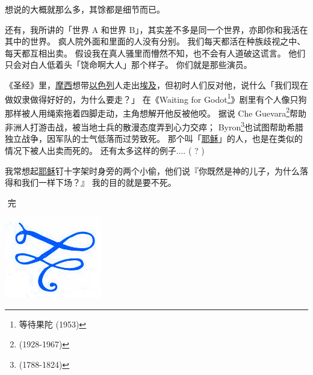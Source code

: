 \documentclass[12pt]{report}
\newcommand*\dashh{\textemdash\,\,}
\begin{document}
{\begin{figure}[ht]
\centering
{}
\end{figure}

想说的大概就那么多，其馀都是细节而已。

还有，我所讲的「世界 A 和世界 B」，其实差不多是同一个世界，亦即你和我活在其中的世界。 疯人院外面和里面的人没有分别。 我们每天都活在种族歧视之中、每天都互相出卖。 假设我在真人骚里而懵然不知，也不会有人道破这谎言。 他们只会对白人低着头「饶命啊大人」那个样子。 你们就是那些演员。

《圣经》里，\uline{摩西}想带\uline{以色列}人走出\uline{埃及}，但初时人们反对他，说什么「我们现在做奴隶做得好好的，为什么要走？」 在《Waiting for Godot\footnote{等待果陀 (1953)}》剧里有个人像只狗那样被人用绳索拖着四脚走动，主角想解开他反被他咬。 据说 Che Guevara\footnote{(1928-1967)}帮助非洲人打游击战，被当地士兵的散漫态度弄到心力交瘁； Byron\footnote{(1788-1824)}也试图帮助希腊独立战争，因军队的士气低落而过劳致死。 那个叫「\uline{耶稣}」的人，也是在类似的情况下被人出卖而死的。 还有太多这样的例子.... ( ? )

我常想起\uline{耶稣}钉十字架时身旁的两个小偷，他们说『你既然是神的儿子，为什么落得和我们一样下场？』 我的目的就是要不死。

\begin{center}
\dashh 完 \dashh \par

\includegraphics[scale=0.25]{vignette0.jpg}
\end{center}

}
\end{document}
